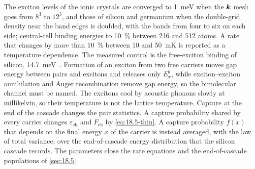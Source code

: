 The exciton levels of the ionic crystals are converged to \SI{1}{meV} when the $\bm{k}$ mesh goes from $8^3$ to $12^3$, and those of silicon and germanium when the double-grid density near the band edges is doubled, with the bands from four to six on each side; central-cell binding energies to \SI{10}{\percent} between 216 and 512 atoms. A rate that changes by more than \SI{10}{\percent} between 10 and \SI{50}{mK} is reported as a temperature dependence. The measured control is the free-exciton binding of silicon, \SI{14.7}{meV}~\cite{shaklee1970valley}. Formation of an exciton from two free carriers moves gap energy between pairs and excitons and releases only $E_x^b$, while exciton--exciton annihilation and Auger recombination remove gap energy, so the bimolecular channel must be named. The excitons cool by acoustic phonons slowly at millikelvin, so their temperature is not the lattice temperature. Capture at the end of the cascade changes the pair statistics. A capture probability shared by every carrier changes $\varepsilon_{\mathrm{eh}}$ and $F_{\mathrm{eh}}$ by \cref{eq:18.5-thin}. A capture probability $f(x)$ that depends on the final energy $x$ of the carrier is instead averaged, with the law of total variance, over the end-of-cascade energy distribution that the silicon cascade records. The parameters close the rate equations and the end-of-cascade populations of \cref{sec:18.5}.

